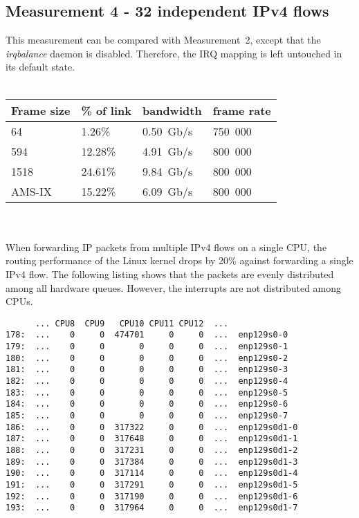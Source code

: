 
\subsection{Measurement 4 - 32 independent IPv4 flows}
This measurement can be compared with Measurement~2, except that the {\it{irqbalance}} daemon is disabled.
Therefore, the IRQ mapping is left untouched in its default state.
\\
\\
\begin{tabular}{ | l | l | l | l | }
\hline
Frame size & \% of link & bandwidth & frame rate \\
\hline
64     &  1.26\% &  0.50~Gb/s & 750~000 \\
594    & 12.28\% &  4.91~Gb/s & 800~000 \\
1518   & 24.61\% &  9.84~Gb/s & 800~000 \\
AMS-IX & 15.22\% &  6.09~Gb/s & 800~000 \\
\hline
\end{tabular}
\\
\\
When forwarding IP packets from multiple IPv4 flows on a single CPU,
the routing performance of the Linux kernel drops by 20\% against forwarding a single IPv4 flow.
The following listing shows that
the packets are evenly distributed among all hardware queues.
However, the interrupts are not distributed among CPUs.
\begin{lstlisting}
      ... CPU8  CPU9   CPU10 CPU11 CPU12  ...
178:  ...    0     0  474701     0     0  ...  enp129s0-0
179:  ...    0     0       0     0     0  ...  enp129s0-1
180:  ...    0     0       0     0     0  ...  enp129s0-2
181:  ...    0     0       0     0     0  ...  enp129s0-3
182:  ...    0     0       0     0     0  ...  enp129s0-4
183:  ...    0     0       0     0     0  ...  enp129s0-5
184:  ...    0     0       0     0     0  ...  enp129s0-6
185:  ...    0     0       0     0     0  ...  enp129s0-7
186:  ...    0     0  317322     0     0  ...  enp129s0d1-0
187:  ...    0     0  317648     0     0  ...  enp129s0d1-1
188:  ...    0     0  317231     0     0  ...  enp129s0d1-2
189:  ...    0     0  317384     0     0  ...  enp129s0d1-3
190:  ...    0     0  317114     0     0  ...  enp129s0d1-4
191:  ...    0     0  317291     0     0  ...  enp129s0d1-5
192:  ...    0     0  317190     0     0  ...  enp129s0d1-6
193:  ...    0     0  317964     0     0  ...  enp129s0d1-7
\end{lstlisting}
